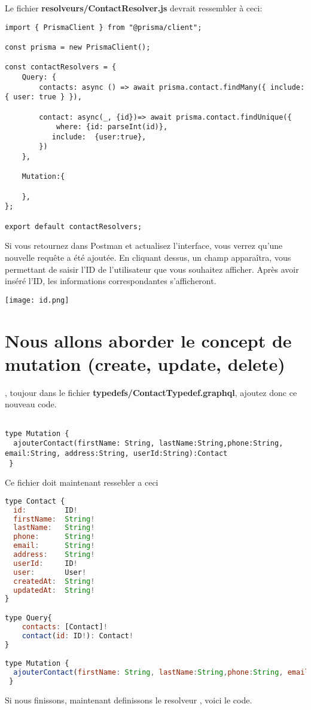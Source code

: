 \documentclass{article}
\begin{document}
Le fichier \textbf{resolveurs/ContactResolver.js} devrait ressembler à ceci:
\begin{lstlisting}
import { PrismaClient } from "@prisma/client";

const prisma = new PrismaClient();

const contactResolvers = {
    Query: {
        contacts: async () => await prisma.contact.findMany({ include: { user: true } }),
        
        contact: async(_, {id})=> await prisma.contact.findUnique({
            where: {id: parseInt(id)},
           include:  {user:true},
        })
    },

    Mutation:{

    },
};

export default contactResolvers;

\end{lstlisting}Si vous retournez dans Postman et actualisez l'interface, vous verrez qu'une nouvelle requête a été ajoutée. En cliquant dessus, un champ apparaîtra, vous permettant de saisir l'ID de l'utilisateur que vous souhaitez afficher. Après avoir inséré l'ID, les informations correspondantes s'afficheront.
\begin{center} 
    \texttt{[image: id.png]} 
\end{center}

\section{Nous allons aborder le concept de mutation (create, update, delete)}, toujour dans le fichier \textbf{typedefs/ContactTypedef.graphql}, ajoutez donc ce nouveau code.
\begin{lstlisting}

type Mutation {    
  ajouterContact(firstName: String, lastName:String,phone:String, email:String, address:String, userId:String):Contact
 }
\end{lstlisting}
Ce fichier doit maintenant ressebler a ceci
\begin{lstlisting}[language=JavaScript]
type Contact {
  id:         ID!       
  firstName:  String!   
  lastName:   String!    
  phone:      String!   
  email:      String!   
  address:    String!  
  userId:     ID!       
  user:       User!      
  createdAt:  String! 
  updatedAt:  String! 
}

type Query{
    contacts: [Contact]!
    contact(id: ID!): Contact!
}

type Mutation {    
  ajouterContact(firstName: String, lastName:String,phone:String, email:String, address:String, userId:String):Contact
 }

\end{lstlisting}
Si nous finissons, maintenant definissons le resolveur , voici le code.
\end{document}
